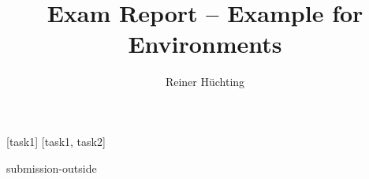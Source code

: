 \documentclass[a4paper]{scrartcl}
\begin{document}
    \title{Exam Report -- Example for Environments}
    \author{Reiner Hüchting}

    \maketitle

    \begin{examreport}[../submissions]
        [task1]
        [task1, task2]
    \end{examreport}

    \begin{submissionreport}{submission-outside}
    \end{submissionreport}
\end{document}
